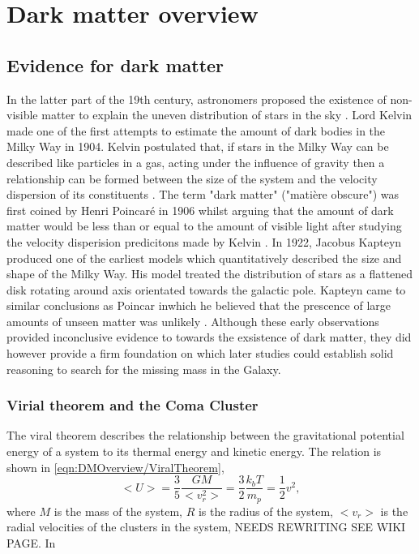 \chapter{Dark matter overview}\label{chap:DarkMatterOverview}
\section{Evidence for dark matter}\label{sec:DMOverview/Evidence4DM}
In the latter part of the 19th century, astronomers proposed the existence of non-visible matter to explain the uneven distribution of stars in the sky \cite{HistoryofDM}.
Lord Kelvin made one of the first attempts to estimate the amount of dark bodies in the Milky Way in 1904.
Kelvin postulated that, if stars in the Milky Way can be described like particles in a gas, acting under the influence of gravity then a relationship can be formed between the size of the system and the velocity dispersion of its constituents \cite{Kelvin1904}.
The term "dark matter" ("matière obscure") was first coined by Henri Poincar\'e in 1906 whilst arguing that the amount of dark matter would be less than or equal to the amount of visible light after studying the velocity disperision predicitons made by Kelvin \cite{HPon}.
In 1922, Jacobus Kapteyn produced one of the earliest models which quantitatively described the size and shape of the Milky Way. 
His model treated the distribution of stars as a flattened disk rotating around axis orientated towards the galactic pole.
Kapteyn came to similar conclusions as Poincar inwhich he believed that the prescence of large amounts of unseen matter was unlikely \cite{Kapteyn1922}.
Although these early observations provided inconclusive evidence to towards the exsistence of dark matter, they did however provide a firm foundation on which later studies could establish solid reasoning to search for the missing mass in the Galaxy.
\subsection{Virial theorem and the Coma Cluster}\label{sec:DMOverview/ViralTheorem}
The viral theorem describes the relationship between the gravitational potential energy of a system to its thermal energy and kinetic energy. The relation is shown in \autoref{eqn:DMOverview/ViralTheorem},
\begin{equation}\label{eqn:DMOverview/ViralTheorem}
    <U>=\frac{3}{5}\frac{GM}{<v_r^2>}=\frac{3}{2}\frac{k_{b}T}{m_{p}}=\frac{1}{2}v^2,
\end{equation}
where $M$ is the mass of the system, $R$ is the radius of the system, $<v_r>$ is the radial velocities of the clusters in the system, NEEDS REWRITING SEE WIKI PAGE.
In 
